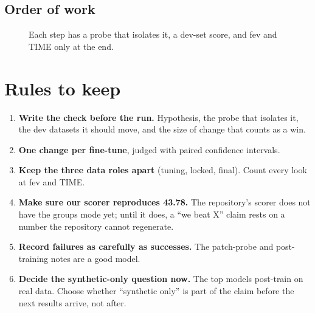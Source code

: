 \documentclass[10pt,a4paper]{article}
\begin{document}
\subsection{Order of work}
\begin{figure}[H]
\centering
{}
\caption{Each step has a probe that isolates it, a dev-set score, and fev and TIME only at the end.}
\end{figure}

\section{Rules to keep}

\begin{keep}[Discipline]
\begin{enumerate}[leftmargin=16pt]
\item \textbf{Write the check before the run.} Hypothesis, the probe that isolates it, the dev datasets it should move, and the size of change that counts as a win.
\item \textbf{One change per fine-tune}, judged with paired confidence intervals.
\item \textbf{Keep the three data roles apart} (tuning, locked, final). Count every look at fev and TIME.
\item \textbf{Make sure our scorer reproduces 43.78.} The repository's scorer does not have the groups mode yet; until it does, a ``we beat X'' claim rests on a number the repository cannot regenerate.
\item \textbf{Record failures as carefully as successes.} The patch-probe and post-training notes are a good model.
\item \textbf{Decide the synthetic-only question now.} The top models post-train on real data. Choose whether ``synthetic only'' is part of the claim before the next results arrive, not after.
\end{enumerate}
\end{keep}
\end{document}

